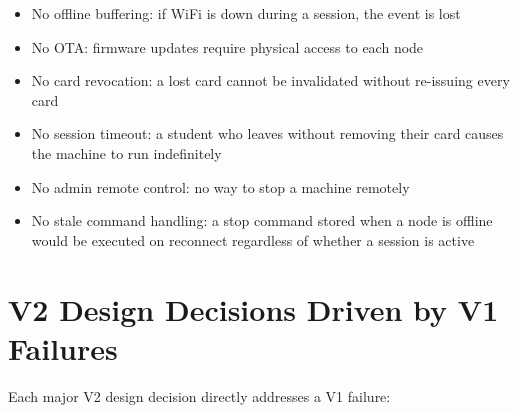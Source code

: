 \begin{itemize}[leftmargin=1.5em]
    \item No offline buffering: if WiFi is down during a session, the event is lost
    \item No OTA: firmware updates require physical access to each node
    \item No card revocation: a lost card cannot be invalidated without re-issuing every card
    \item No session timeout: a student who leaves without removing their card causes the machine to run indefinitely
    \item No admin remote control: no way to stop a machine remotely
    \item No stale command handling: a stop command stored when a node is offline would be executed on reconnect regardless of whether a session is active
\end{itemize}

\section{V2 Design Decisions Driven by V1 Failures}

Each major V2 design decision directly addresses a V1 failure:

